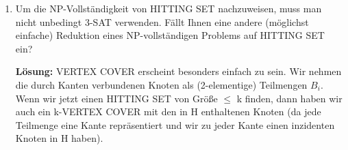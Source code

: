 \documentclass[12pt,a4paper]{scrartcl}
\newcommand{\loesung}[1]{\vspace{.5\baselineskip}\begin{addmargin}[0pt]{0pt}\textbf{Lösung: }#1\end{addmargin}}
\begin{document}
\begin{enumerate}
\begin{enumerate}
{	}
	
	\item Um die NP-Vollständigkeit von HITTING SET nachzuweisen, muss man nicht unbedingt 3-SAT verwenden. Fällt Ihnen eine andere (möglichst einfache) Reduktion eines NP-vollständigen Problems auf HITTING SET ein?
	
	\loesung{VERTEX COVER erscheint besonders einfach zu sein. Wir nehmen die durch Kanten verbundenen Knoten als (2-elementige) Teilmengen $B_i$. Wenn wir jetzt einen HITTING SET von Größe $\leq$ k finden, dann haben wir auch ein k-VERTEX COVER mit den in H enthaltenen Knoten (da jede Teilmenge eine Kante repräsentiert und wir zu jeder Kante einen inzidenten Knoten in H haben).}
	\end{enumerate}

\end{enumerate}
\end{document}
